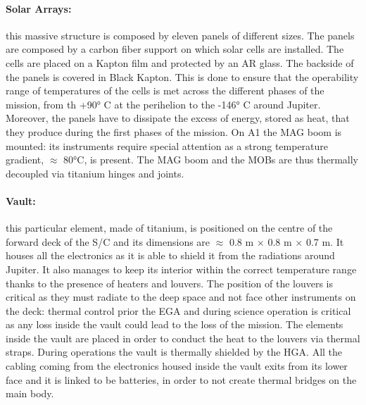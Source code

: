 \vspace{-4mm}

\paragraph{Solar Arrays:} this massive structure is composed by eleven panels of different sizes. The panels are composed by a carbon fiber support on which solar cells are installed. The cells are placed on a Kapton film and protected by an AR glass. The backside of the panels is covered in Black Kapton. This is done to ensure that the operability range of temperatures of the cells is met across the different phases of the mission, from th +90° C at the perihelion to the -146° C around Jupiter.\cite{pannelli} Moreover, the panels have to dissipate the excess of energy, stored as heat, that they produce during the first phases of the mission. On A1 the MAG boom is mounted: its instruments require special attention as a strong temperature gradient,  $\approx$ 80°C, is present.\cite{pannelli}
The MAG boom and the MOBs are thus thermally decoupled via titanium hinges and joints.\cite{pannelli}

\vspace{-4mm}

\paragraph{Vault:}this particular element, made of titanium, is positioned on the centre of the forward deck of the S/C and its dimensions are  $\approx$ 0.8 m $\times$ 0.8 m $\times$ 0.7 m.\cite{Rad_vault} It houses all the electronics as it is able to shield it from the radiations around Jupiter. It also manages to keep its interior within the correct temperature range thanks to the presence of heaters and louvers. The position of the louvers is critical as they must radiate to the deep space and not face other instruments on the deck: thermal control prior the EGA and during science operation is critical as any loss inside the vault could lead to the loss of the mission. The elements inside the vault are placed in order to conduct the heat to the louvers via thermal straps.\cite{louvers} During operations the vault is thermally shielded by the HGA. All the cabling coming from the electronics housed inside the vault exits from its lower face and it is linked to be batteries, in order to not create thermal bridges on the main body.

\vspace{-4mm}

